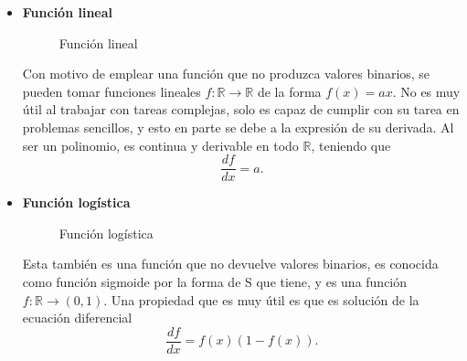 			\begin{itemize}
				\item \textbf{Función lineal}
				
				\begin{figure}[!h]
					\centering
					\caption{Función lineal}
					\label{fig:funcion_lineal}
				\end{figure}
				
				Con motivo de emplear una función que no produzca valores binarios, se pueden tomar funciones lineales $f: \mathbb{R} \longrightarrow \mathbb{R}$ de la forma $f(x) = ax$. No es muy útil al trabajar con tareas complejas, solo es capaz de cumplir con su tarea en problemas sencillos, y esto en parte se debe a la expresión de su derivada. Al ser un polinomio, es continua y derivable en todo $\mathbb{R}$, teniendo que
				$$
				\frac{df}{dx} = a. 
				$$
				
				\item \textbf{Función logística}
				
				\begin{figure}[!h]
					\centering
					\caption{Función logística}
					\label{fig:funcion_sigmoide}
				\end{figure}
				
				Esta también es una función que no devuelve valores binarios, es conocida como función sigmoide por la forma de S que tiene, y es una función $f: \mathbb{R} \longrightarrow (0, 1)$. Una propiedad que es muy útil es que es solución de la ecuación diferencial
				$$
				\frac{df}{dx} = f(x)(1 - f(x)). 
				$$
				

\end{itemize}
